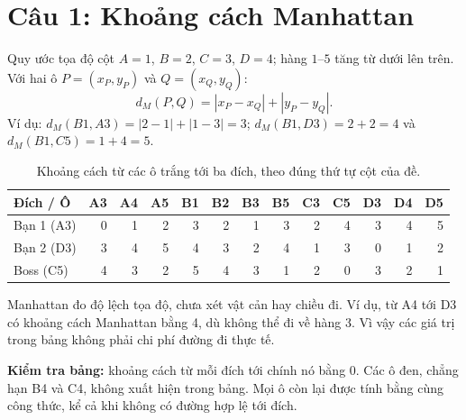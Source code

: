 \section{Câu 1: Khoảng cách Manhattan}

Quy ước tọa độ cột $A=1$, $B=2$, $C=3$, $D=4$; hàng $1$--$5$ tăng từ dưới lên trên. Với hai ô $P=(x_P,y_P)$ và $Q=(x_Q,y_Q)$:
\[
    \boxed{d_M(P,Q)=|x_P-x_Q|+|y_P-y_Q|.}
\]
Ví dụ: $d_M(B1,A3)=|2-1|+|1-3|=3$;
$d_M(B1,D3)=2+2=4$ và $d_M(B1,C5)=1+4=5$.

\begin{table}[ht!]
    \centering
    \caption{Khoảng cách từ các ô trắng tới ba đích, theo đúng thứ tự cột của đề.}
    {\fontsize{10.5pt}{13pt}\selectfont
    \setlength{\tabcolsep}{3.7pt}
    \renewcommand{\arraystretch}{1.35}
    \begin{tabular}{l*{12}{r}}
        \toprule
        \textbf{Đích / Ô} & A3 & A4 & A5 & B1 & B2 & B3 & B5 & C3 & C5 & D3 & D4 & D5 \\
        \midrule
        Bạn 1 (A3) & 0 & 1 & 2 & 3 & 2 & 1 & 3 & 2 & 4 & 3 & 4 & 5 \\
        Bạn 2 (D3) & 3 & 4 & 5 & 4 & 3 & 2 & 4 & 1 & 3 & 0 & 1 & 2 \\
        Boss (C5) & 4 & 3 & 2 & 5 & 4 & 3 & 1 & 2 & 0 & 3 & 2 & 1 \\
        \bottomrule
    \end{tabular}}
\end{table}

Manhattan đo độ lệch tọa độ, chưa xét vật cản hay chiều đi. Ví dụ, từ A4 tới D3 có khoảng cách Manhattan bằng 4, dù không thể đi về hàng 3. Vì vậy các giá trị trong bảng không phải chi phí đường đi thực tế.

\noindent\textbf{Kiểm tra bảng:} khoảng cách từ mỗi đích tới chính nó bằng 0. Các ô đen, chẳng hạn B4 và C4, không xuất hiện trong bảng. Mọi ô còn lại được tính bằng cùng công thức, kể cả khi không có đường hợp lệ tới đích.
